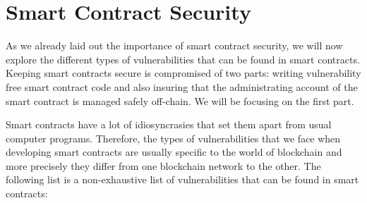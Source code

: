\section{Smart Contract Security}
As we already laid out the importance of smart contract security, we will now explore the different types of vulnerabilities that can be found in smart contracts. Keeping smart contracts secure is compromised of two parts: writing vulnerability free smart contract code and also insuring that the administrating account of the smart contract is managed safely off-chain. We will be focusing on the first part.

Smart contracts have a lot of idiosyncrasies that set them apart from usual computer programs. Therefore, the types of vulnerabilities that we face when developing smart contracts are usually specific to the world of blockchain and more precisely they differ from one blockchain network to the other. The following list is a non-exhaustive list of vulnerabilities that can be found in smart contracts:
